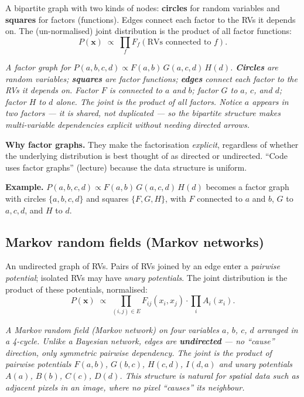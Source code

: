 \documentclass[11pt, a4paper]{article}
\begin{document}
\begin{defbox}
A bipartite graph with two kinds of nodes: \textbf{circles} for random variables and \textbf{squares} for factors (functions). Edges connect each factor to the RVs it depends on. The (un-normalised) joint distribution is the product of all factor functions:
\[
P(\mathbf{x}) \;\propto\; \prod_f F_f(\text{RVs connected to }f).
\]
\end{defbox}

\begin{center}

\footnotesize\textit{A factor graph for $P(a,b,c,d) \propto F(a,b)\,G(a,c,d)\,H(d)$. \textbf{Circles} are random variables; \textbf{squares} are factor functions; \textbf{edges} connect each factor to the RVs it depends on. Factor $F$ is connected to $a$ and $b$; factor $G$ to $a$, $c$, and $d$; factor $H$ to $d$ alone. The joint is the product of all factors. Notice $a$ appears in two factors --- it is shared, not duplicated --- so the bipartite structure makes multi-variable dependencies explicit without needing directed arrows.}
\end{center}

\textbf{Why factor graphs.} They make the factorisation \emph{explicit}, regardless of whether the underlying distribution is best thought of as directed or undirected. ``Code uses factor graphs'' (lecture) because the data structure is uniform.

\textbf{Example.} $P(a,b,c,d) \propto F(a,b)\,G(a,c,d)\,H(d)$ becomes a factor graph with circles $\{a,b,c,d\}$ and squares $\{F, G, H\}$, with $F$ connected to $a$ and $b$, $G$ to $a, c, d$, and $H$ to $d$.

\subsection{Markov random fields (Markov networks)}

\begin{defbox}
An undirected graph of RVs. Pairs of RVs joined by an edge enter a \emph{pairwise potential}; isolated RVs may have \emph{unary potentials}. The joint distribution is the product of these potentials, normalised:
\[
P(\mathbf{x}) \;\propto\; \prod_{(i,j)\in E} F_{ij}(x_i, x_j) \cdot \prod_{i} A_i(x_i).
\]
\end{defbox}

\begin{center}

\footnotesize\textit{A Markov random field (Markov network) on four variables $a$, $b$, $c$, $d$ arranged in a 4-cycle. Unlike a Bayesian network, edges are \textbf{undirected} --- no ``cause'' direction, only symmetric pairwise dependency. The joint is the product of pairwise potentials $F(a,b)$, $G(b,c)$, $H(c,d)$, $I(d,a)$ and unary potentials $A(a)$, $B(b)$, $C(c)$, $D(d)$. This structure is natural for spatial data such as adjacent pixels in an image, where no pixel ``causes'' its neighbour.}
\end{center}
\end{document}
